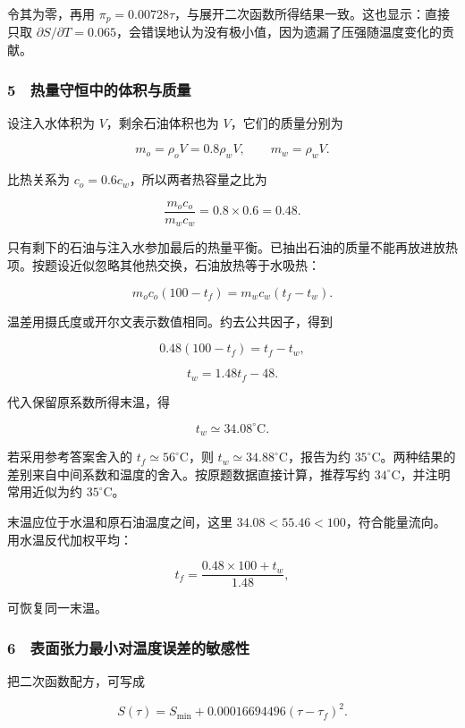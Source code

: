 \documentclass[12pt,a4paper,fontset=fandol]{ctexart}
\begin{document}
令其为零，再用
\(\pi_p=0.00728\tau\)，与展开二次函数所得结果一致。这也显示：直接只取
\(\partial S/\partial T=0.065\)，会错误地认为没有极小值，因为遗漏了压强随温度变化的贡献。

\subsubsection{5　热量守恒中的体积与质量}\label{ux70edux91cfux5b88ux6052ux4e2dux7684ux4f53ux79efux4e0eux8d28ux91cf}

设注入水体积为 \(V\)，剩余石油体积也为 \(V\)，它们的质量分别为

\[m_o=\rho_oV=0.8\rho_wV,
\qquad m_w=\rho_wV.\]

比热关系为 \(c_o=0.6c_w\)，所以两者热容量之比为

\[\frac{m_oc_o}{m_wc_w}=0.8\times0.6=0.48.\]

只有剩下的石油与注入水参加最后的热量平衡。已抽出石油的质量不能再放进放热项。按题设近似忽略其他热交换，石油放热等于水吸热：

\[m_oc_o(100-t_f)=m_wc_w(t_f-t_w).\]

温差用摄氏度或开尔文表示数值相同。约去公共因子，得到

\[0.48(100-t_f)=t_f-t_w,\]

\[\boxed{t_w=1.48t_f-48.}\]

代入保留原系数所得末温，得

\[\boxed{t_w\simeq34.08^\circ\mathrm C.}\]

若采用参考答案舍入的 \(t_f\simeq56^\circ\mathrm C\)，则
\(t_w\simeq34.88^\circ\mathrm C\)，报告为约
\(35^\circ\mathrm C\)。两种结果的差别来自中间系数和温度的舍入。按原题数据直接计算，推荐写约
\(34^\circ\mathrm C\)，并注明常用近似为约 \(35^\circ\mathrm C\)。

末温应位于水温和原石油温度之间，这里
\(34.08<55.46<100\)，符合能量流向。用水温反代加权平均：

\[t_f=\frac{0.48\times100+t_w}{1.48},\]

可恢复同一末温。

\subsubsection{6　表面张力最小对温度误差的敏感性}\label{ux8868ux9762ux5f20ux529bux6700ux5c0fux5bf9ux6e29ux5ea6ux8befux5deeux7684ux654fux611fux6027}

把二次函数配方，可写成

\[S(\tau)=S_{\min}
+0.00016694496(\tau-\tau_f)^2.\]
\end{document}
